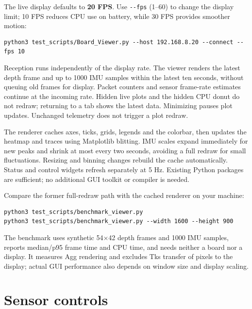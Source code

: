 \documentclass[10pt,a4paper,oneside]{report}
\begin{document}
The live display defaults to \textbf{20 FPS}. Use \texttt{-\allowbreak{}-\allowbreak{}fps} (1--60) to change the display limit; 10 FPS reduces CPU use on battery, while 30 FPS provides smoother motion:

\begin{verbatim}
python3 test_scripts/Board_Viewer.py --host 192.168.8.20 --connect --fps 10
\end{verbatim}

Reception runs independently of the display rate. The viewer renders the latest depth frame and up to 1000 IMU samples within the latest ten seconds, without queuing old frames for display. Packet counters and sensor frame-rate estimates continue at the incoming rate. Hidden live plots and the hidden CPU donut do not redraw; returning to a tab shows the latest data. Minimizing pauses plot updates. Unchanged telemetry does not trigger a plot redraw.

The renderer caches axes, ticks, grids, legends and the colorbar, then updates the heatmap and traces using Matplotlib blitting. IMU scales expand immediately for new peaks and shrink at most every two seconds, avoiding a full redraw for small fluctuations. Resizing and binning changes rebuild the cache automatically. Status and control widgets refresh separately at 5 Hz. Existing Python packages are sufficient; no additional GUI toolkit or compiler is needed.

Compare the former full-redraw path with the cached renderer on your machine:

\begin{verbatim}
python3 test_scripts/benchmark_viewer.py
python3 test_scripts/benchmark_viewer.py --width 1600 --height 900
\end{verbatim}

The benchmark uses synthetic 54×42 depth frames and 1000 IMU samples, reports median/p95 frame time and CPU time, and needs neither a board nor a display. It measures Agg rendering and excludes Tk\textquotesingle s transfer of pixels to the display; actual GUI performance also depends on window size and display scaling.

\section{Sensor controls}\label{wiki-tools-device-monitor--sensor-controls}
\end{document}
